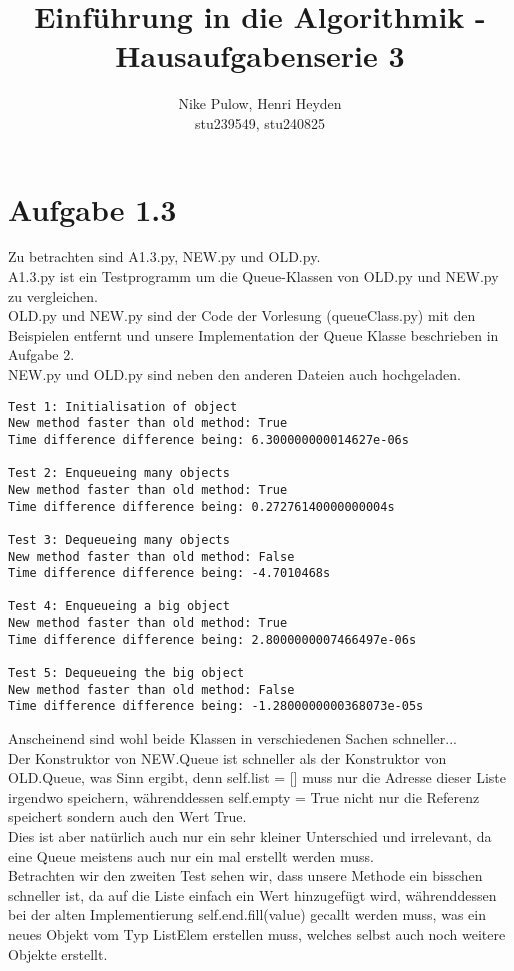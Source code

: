 \documentclass[12pt, a4paper]{article}
\title{Einführung in die Algorithmik - Hausaufgabenserie 3}
\author{Nike Pulow, Henri Heyden\\ \small stu239549, stu240825}
\date{}
\begin{document}
\maketitle

\onehalfspacing

\section*{Aufgabe 1.3}
Zu betrachten sind A1.3.py, NEW.py und OLD.py. \\
A1.3.py ist ein Testprogramm um die Queue-Klassen von OLD.py und NEW.py zu vergleichen. \\
OLD.py und NEW.py sind der Code der Vorlesung (queueClass.py) mit den Beispielen entfernt und unsere Implementation der Queue Klasse beschrieben in Aufgabe 2. \\
NEW.py und OLD.py sind neben den anderen Dateien auch hochgeladen.
\singlespacing
\begin{lstlisting}[caption={Output von A1.3.py unter meiner Maschine}]
Test 1: Initialisation of object
New method faster than old method: True 
Time difference difference being: 6.300000000014627e-06s

Test 2: Enqueueing many objects
New method faster than old method: True 
Time difference difference being: 0.27276140000000004s

Test 3: Dequeueing many objects
New method faster than old method: False 
Time difference difference being: -4.7010468s

Test 4: Enqueueing a big object
New method faster than old method: True 
Time difference difference being: 2.8000000007466497e-06s

Test 5: Dequeueing the big object
New method faster than old method: False 
Time difference difference being: -1.2800000000368073e-05s
\end{lstlisting}
\onehalfspacing
Anscheinend sind wohl beide Klassen in verschiedenen Sachen schneller... \\
Der Konstruktor von NEW.Queue ist schneller als der Konstruktor von OLD.Queue, was Sinn ergibt, denn self.list = [] muss nur die Adresse dieser Liste irgendwo speichern, währenddessen self.empty = True nicht nur die Referenz speichert sondern auch den Wert True. \\
Dies ist aber natürlich auch nur ein sehr kleiner Unterschied und irrelevant, da eine Queue meistens auch nur ein mal erstellt werden muss.\\
Betrachten wir den zweiten Test sehen wir, dass unsere Methode ein bisschen schneller ist, da auf die Liste einfach ein Wert hinzugefügt wird, währenddessen bei der alten Implementierung self.end.fill(value) gecallt werden muss, was ein neues Objekt vom Typ ListElem erstellen muss, welches selbst auch noch weitere Objekte erstellt. \\
\end{document}
